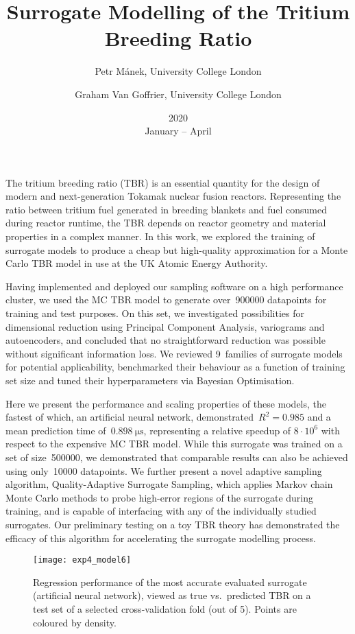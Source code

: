 \documentclass{article}
\title{Surrogate Modelling of the Tritium Breeding Ratio}
\date{2020\\ January -- April}
\author{
	Petr Mánek, University College London\\
	\and Graham Van Goffrier, University College London
}
\begin{document}
\maketitle
\thispagestyle{empty}

The tritium breeding ratio (TBR) is an essential quantity for the design of
modern and next-generation Tokamak nuclear fusion reactors. Representing the
ratio between tritium fuel generated in breeding blankets and fuel consumed
during reactor runtime, the TBR depends on reactor geometry and material
properties in a complex manner. In this work, we explored the
training of surrogate models to produce a cheap but high-quality approximation
for a Monte Carlo TBR model in use at the UK Atomic Energy Authority.

Having implemented and deployed our sampling software on a high performance cluster, we
used the MC TBR model to generate over~\num{900000} datapoints for training and
test purposes. On this set, we investigated possibilities for
dimensional reduction using Principal Component Analysis, variograms and
autoencoders, and concluded that no straightforward reduction was possible
without significant information loss. We reviewed 9~families of surrogate models for potential
applicability, benchmarked their behaviour as a function of training set size and tuned their
hyperparameters via Bayesian Optimisation.

Here we present the performance and scaling properties of these
models, the fastest of which, an artificial neural network,
demonstrated~$R^2=\num{0.985}$ and a mean
prediction time of~$\SI{0.898}{\micro\second}$, representing a relative speedup of $8\cdot 10^6$
with respect to the expensive MC TBR model. While this surrogate was trained on
a set of size~\num{500000}, we demonstrated that comparable results can also be
achieved using only~\num{10000} datapoints. We further present a novel adaptive
sampling algorithm, Quality-Adaptive Surrogate Sampling, which applies Markov chain Monte Carlo methods to probe high-error regions of the surrogate during training, and is capable
of interfacing with any of the individually studied surrogates. Our preliminary
testing on a toy TBR theory has demonstrated the efficacy of this algorithm for
accelerating the surrogate modelling process.

\begin{figure}[h]
	\centering
	\texttt{[image: exp4\_model6]}
	\caption{Regression performance of the most accurate evaluated surrogate
		(artificial neural network), viewed as true vs.~predicted TBR on a test
		set of a selected cross-validation fold (out of 5). Points are coloured by density.}
\end{figure}
\end{document}
